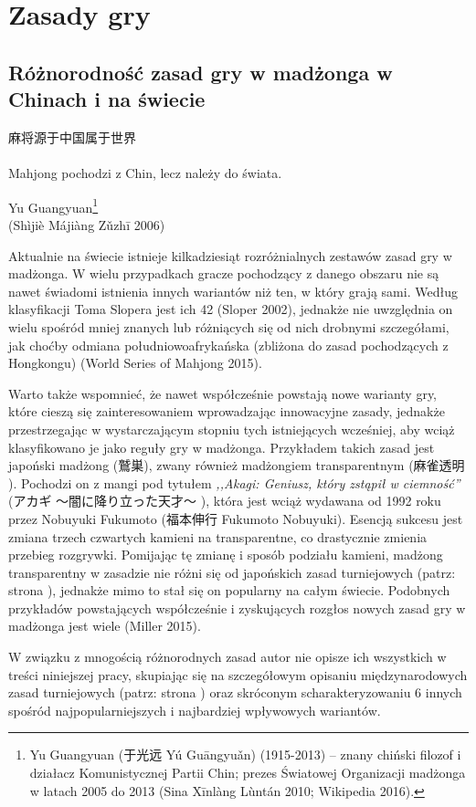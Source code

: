 \chapter{Zasady gry}
\section{Różnorodność zasad gry w madżonga w Chinach i na świecie}
\epigraph{麻将源于中国属于世界 \\ 
\footnotesize {} \normalsize \\
Mahjong pochodzi z Chin, lecz
należy do świata.}{Yu Guangyuan\footnote{Yu Guangyuan (于光远 Yú
Guāngyuǎn) (1915-2013) -- znany chiński filozof i działacz Komunistycznej Partii
Chin; prezes Światowej Organizacji madżonga w latach 2005 do 2013 (Sina
Xīnlàng Lùntán 2010; Wikipedia 2016).}
\\ (Shìjiè Májiàng Zǔzhī 2006)}

Aktualnie na świecie istnieje kilkadziesiąt rozróżnialnych zestawów zasad gry
w madżonga. W wielu przypadkach gracze pochodzący z danego obszaru nie są
nawet świadomi istnienia innych wariantów niż ten, w który grają sami. Według
klasyfikacji Toma Slopera jest ich 42 (Sloper 2002), jednakże nie uwzględnia on
wielu spośród mniej znanych lub różniących się od nich drobnymi szczegółami, jak
choćby odmiana południowoafrykańska (zbliżona do zasad pochodzących z Hongkongu)
(World Series of Mahjong 2015).

Warto także wspomnieć, że nawet współcześnie powstają nowe warianty gry, które
cieszą się zainteresowaniem wprowadzając innowacyjne zasady, jednakże przestrzegając w
wystarczającym stopniu tych istniejących wcześniej, aby wciąż klasyfikowano je
jako reguły gry w madżonga. Przykładem takich zasad jest japoński madżong
 (鷲巣), zwany również madżongiem transparentnym (麻雀透明
). Pochodzi on z mangi pod tytułem \textit{,,Akagi:
Geniusz, który zstąpił w ciemność''} (アカギ 〜闇に降り立った天才〜 ), która jest wciąż wydawana od 1992 roku przez Nobuyuki
Fukumoto (福本伸行 Fukumoto Nobuyuki). Esencją sukcesu  jest zmiana
trzech czwartych kamieni na transparentne, co drastycznie zmienia przebieg
rozgrywki. Pomijając tę zmianę i sposób podziału kamieni, madżong transparentny
w zasadzie nie różni się od japońskich zasad turniejowych  (patrz:
strona \pageref{riichi}), jednakże mimo to stał się on popularny na całym
świecie. Podobnych przykładów powstających współcześnie i zyskujących rozgłos
nowych zasad gry w madżonga jest wiele (Miller 2015).

W związku z mnogością różnorodnych zasad autor nie opisze ich wszystkich w
treści niniejszej pracy, skupiając się na szczegółowym opisaniu międzynarodowych
zasad turniejowych (patrz: strona \pageref{guobiao}) oraz skróconym
scharakteryzowaniu 6 innych spośród najpopularniejszych i najbardziej wpływowych
wariantów. 
